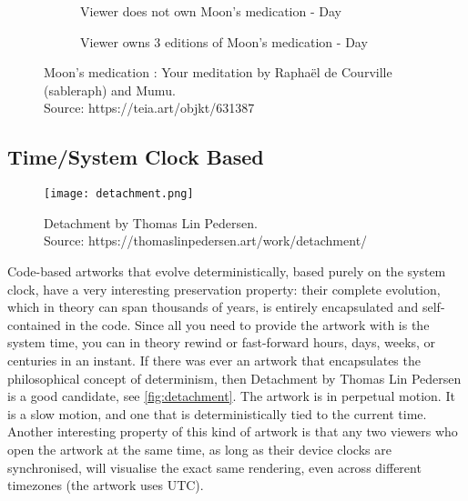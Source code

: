 \begin{figure}[H]
  \centering
  \captionsetup{justification=centering}
  \begin{subfigure}[b]{0.45\textwidth}
    \centering
    \caption{Viewer does not own Moon's medication - Day}
    \label{fig:adam-no-own}
  \end{subfigure}
  \hfill
  \begin{subfigure}[b]{0.45\textwidth}
    \centering
    \caption{Viewer owns 3 editions of Moon's medication - Day}
    \label{fig:adam-own}
  \end{subfigure}
  \caption{Moon's medication : Your meditation by Raphaël de Courville (sableraph) and Mumu. \\ Source: https://teia.art/objkt/631387}
  \label{fig:vdp-examples}
\end{figure}


\subsection{Time/System Clock Based}

\begin{figure}[h]
    \centering
    \captionsetup{justification=centering}
    \texttt{[image: detachment.png]}
    \captionsetup{justification=centering}
    \caption[Detachment by Thomas Lin Pedersen]{Detachment by Thomas Lin Pedersen. \\ Source: https://thomaslinpedersen.art/work/detachment/}
    \label{fig:detachment}
\end{figure}

Code-based artworks that evolve deterministically, based purely on the system clock, have a very interesting preservation property: their complete evolution, which in theory can span thousands of years, is entirely encapsulated and self-contained in the code. Since all you need to provide the artwork with is the system time, you can in theory rewind or fast-forward hours, days, weeks, or centuries in an instant. If there was ever an artwork that encapsulates the philosophical concept of determinism, then Detachment by Thomas Lin Pedersen is a good candidate, see \autoref{fig:detachment}. The artwork is in perpetual motion. It is a slow motion, and one that is deterministically tied to the current time.
Another interesting property of this kind of artwork is that any two viewers who open the artwork at the same time, as long as their device clocks are synchronised, will visualise the exact same rendering, even across different timezones (the artwork uses UTC).

